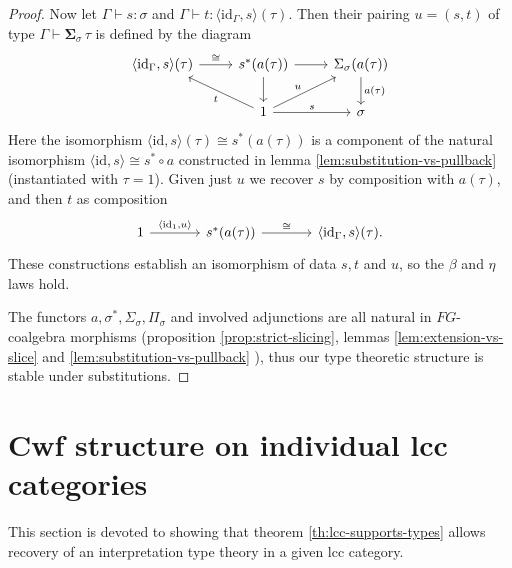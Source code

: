\documentclass[a4paper]{article}
\theoremstyle{remark}
\theoremstyle{definition}
\begin{document}
\begin{proof}
  Now let $\Gamma \vdash s : \sigma$ and $\Gamma \vdash t : \langle \mathrm{id}_\Gamma, s \rangle(\tau)$.
  Then their pairing $u = (s, t)$ of type $\Gamma \vdash \mathbf{\Sigma}_\sigma \, \tau$ is defined by the diagram
  \begin{equation}
    \begin{tikzcd}
      \langle \mathrm{id}_\Gamma, s \rangle(\tau) \arrow[r, "\cong"] & s^*(a(\tau)) \arrow[r] \arrow[d] & \Sigma_\sigma(a(\tau)) \arrow[d, "a(\tau)"] \\
      & 1 \arrow[ul, "t"] \arrow[r, "s"] \arrow[ur, "u"] & \sigma
    \end{tikzcd}
  \end{equation}
  Here the isomorphism $\langle \mathrm{id}, s \rangle(\tau) \cong s^*(a(\tau))$ is a component of the natural isomorphism $\langle \mathrm{id}, s \rangle \cong s^* \circ a$ constructed in lemma \ref{lem:substitution-vs-pullback} (instantiated with $\tau = 1$).
  Given just $u$ we recover $s$ by composition with $a(\tau)$, and then $t$ as composition
  \begin{equation}
    \begin{tikzcd}[column sep=large]
      1 \arrow[r, "{\langle \mathrm{id}_1, u \rangle}"] & s^*(a(\tau)) \arrow[r, "\cong"] & \langle \mathrm{id}_\Gamma, s \rangle(\tau).
    \end{tikzcd}
  \end{equation}
  These constructions establish an isomorphism of data $s, t$ and $u$, so the $\beta$ and $\eta$ laws hold.

  The functors $a, \sigma^*, \Sigma_\sigma, \Pi_\sigma$ and involved adjunctions are all natural in $FG$-coalgebra morphisms (proposition \ref{prop:strict-slicing}, lemmas \ref{lem:extension-vs-slice} and \ref{lem:substitution-vs-pullback} ), thus our type theoretic structure is stable under substitutions.
\end{proof}

\section{Cwf structure on individual lcc categories}
\label{sec:applications}

This section is devoted to showing that theorem \ref{th:lcc-supports-types} allows recovery of an interpretation type theory in a given lcc category.
\end{document}
